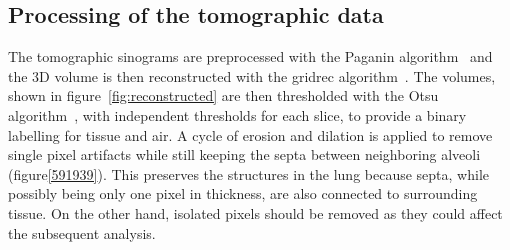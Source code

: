 
\subsection{Processing of the tomographic data}\label{sec:tomoprocessing}
The tomographic sinograms are preprocessed with the Paganin
algorithm~\cite{Paganin_2002a} and
the 3D volume is then reconstructed with the gridrec
algorithm~\cite{Marone_2012}. The volumes, shown in
figure~\ref{fig:reconstructed} are then thresholded with the Otsu
algorithm~\cite{Otsu_1979}, with independent thresholds for each slice, to
provide a binary labelling for tissue and air. A cycle of
erosion and dilation is applied to remove single pixel artifacts while still
keeping the septa between neighboring alveoli (figure\ref{591939}).
This preserves the structures in the lung because septa, while possibly
being only one pixel in thickness, are also connected to surrounding tissue.
On the other hand, isolated pixels should be removed as they could affect
the subsequent analysis.